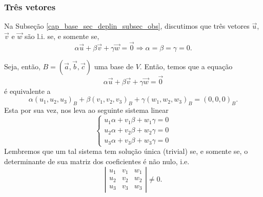 \subsubsection{Três vetores}

Na Subseção \ref{cap_base_sec_deplin_subsec_obs}, discutimos que três vetores $\vec{u}$, $\vec{v}$ e $\vec{w}$ são l.i. se, e somente se,
\begin{equation}
  \alpha\vec{u}+\beta\vec{v}+\gamma\vec{w}=\vec{0} \Rightarrow \alpha=\beta=\gamma=0.
\end{equation}

Seja, então, $B = (\vec{a}, \vec{b}, \vec{c})$ uma base de $V$. Então, temos que a equação
\begin{equation}
  \alpha\vec{u}+\beta\vec{v}+\gamma\vec{w} = \vec{0}
\end{equation}
é equivalente a
\begin{equation}
  \alpha(u_1,u_2,u_3)_B+\beta(v_1,v_2,v_3)_B+\gamma(w_1,w_2,w_3)_B=(0, 0, 0)_B.
\end{equation}
Esta por sua vez, nos leva ao seguinte sistema linear
\begin{equation}
  \left\{
    \begin{array}{l}
      u_1\alpha + v_1\beta + w_1\gamma = 0\\
      u_2\alpha + v_2\beta + w_2\gamma = 0\\
      u_3\alpha + v_3\beta + w_3\gamma = 0
    \end{array}
  \right.
\end{equation}
Lembremos que um tal sistema tem solução única (trivial) se, e somente se, o determinante de sua matriz dos coeficientes é não nulo, i.e.
\begin{equation}
  \left|\begin{array}{ccc}
    u_1 & v_1 & w_1\\
    u_2 & v_2 & w_2\\
    u_3 & v_3 & w_3
  \end{array}\right| \neq 0.
\end{equation}

